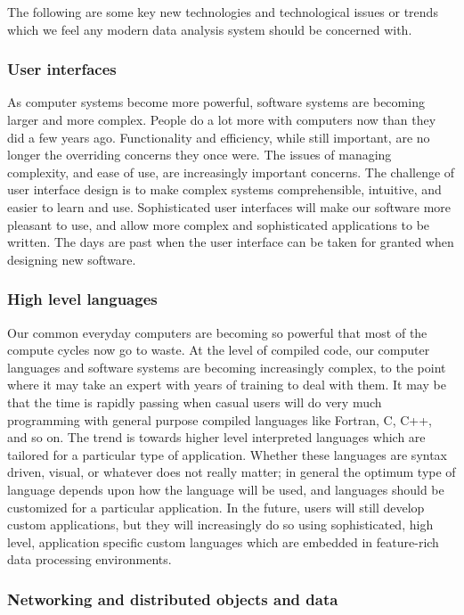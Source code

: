 The following are some key new technologies and technological issues or
trends which we feel any modern data analysis system should be concerned
with.

\vspace {-5pt}
\subsubsection {User interfaces}

As computer systems become more powerful, software systems are becoming
larger and more complex.  People do a lot more with computers now than they
did a few years ago.  Functionality and efficiency, while still important,
are no longer the overriding concerns they once were.  The issues of
managing complexity, and ease of use, are increasingly important concerns.
The challenge of user interface design is to make complex systems
comprehensible, intuitive, and easier to learn and use.  Sophisticated user
interfaces will make our software more pleasant to use, and allow more
complex and sophisticated applications to be written.  The days are past
when the user interface can be taken for granted when designing new
software.

\subsubsection {High level languages}

Our common everyday computers are becoming so powerful that most of the
compute cycles now go to waste.  At the level of compiled code, our computer
languages and software systems are becoming increasingly complex, to the
point where it may take an expert with years of training to deal with them.
It may be that the time is rapidly passing when casual users will do very
much programming with general purpose compiled languages like Fortran, C,
C++, and so on.  The trend is towards higher level interpreted languages
which are tailored for a particular type of application.  Whether these
languages are syntax driven, visual, or whatever does not really matter; in
general the optimum type of language depends upon how the language will be
used, and languages should be customized for a particular application.  In
the future, users will still develop custom applications, but they will
increasingly do so using sophisticated, high level, application specific
custom languages which are embedded in feature-rich data processing
environments.

\subsubsection {Networking and distributed objects and data}


